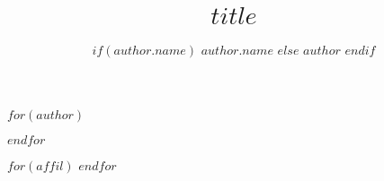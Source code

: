\providecommand{\tightlist}{%
  \setlength{\itemsep}{0pt}\setlength{\parskip}{0pt}}
\usepackage{amsmath,amsfonts,amssymb}
\usepackage{graphicx}
\usepackage{siunitx}
\usepackage[colorlinks=true, allcolors=blue]{hyperref}
\renewcommand{\baselinestretch}{1.0} %
\usepackage{setspace}
\usepackage{tocloft}

\title{$title$}
$for(author)$
\author[$if(author.affil)$
  $author.affil$
  $endif$]{
$if(author.name)$
$author.name$
$else$
$author$
$endif$}
$endfor$

$for(affil)$
$endfor$


\renewcommand{\cftdotsep}{\cftnodots}

